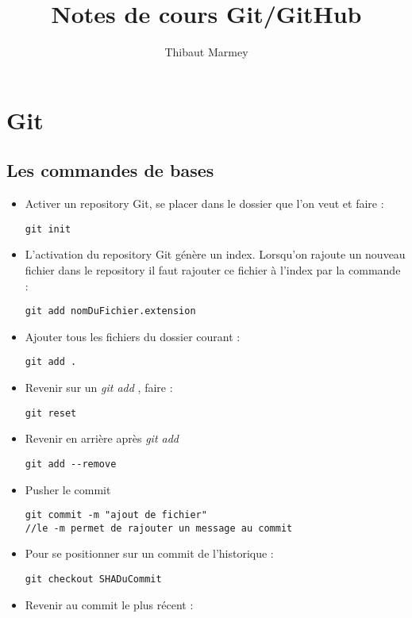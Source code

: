 \documentclass[12pt,a4paper]{article}
\author{Thibaut Marmey}
\title{Notes de cours Git/GitHub}
\begin{document}
	\maketitle

\begin{normalsize}
\tableofcontents
\end{normalsize}

\section{Git}
\subsection{Les commandes de bases}
\begin{itemize}
\item Activer un repository Git, se placer dans le dossier que l’on veut et faire : 
\begin{lstlisting}
git init
\end{lstlisting}
\item L’activation du repository Git génère un index. Lorsqu’on rajoute un nouveau fichier dans le repository il faut rajouter ce fichier à l’index par la commande :
\begin{lstlisting}
git add nomDuFichier.extension
\end{lstlisting}
\item Ajouter tous les fichiers du dossier courant :
\begin{lstlisting}
git add .
\end{lstlisting}
\item Revenir sur un \textit{git add }, faire :
\begin{lstlisting}
git reset
\end{lstlisting}
\item Revenir en arrière après \textit{git add }
\begin{lstlisting}
git add --remove
\end{lstlisting}
\item Pusher le commit
\begin{lstlisting}
git commit -m "ajout de fichier" 
//le -m permet de rajouter un message au commit
\end{lstlisting}
\item Pour se positionner sur un commit de l'historique :
\begin{lstlisting}
git checkout SHADuCommit
\end{lstlisting}
\item Revenir au commit le plus récent : 

\end{itemize}
\end{document}
